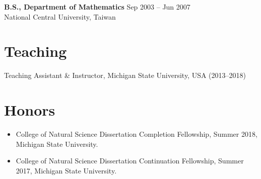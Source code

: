 \documentclass[a4paper,10pt,dvipdfmx]{article}
\begin{document}
\indent \textbf{B.S., Department of Mathematics} \hfill Sep 2003 -- Jun 2007\\
\indent National Central University, Taiwan

\section*{Teaching}
\indent Teaching Assistant \& Instructor, Michigan State University, USA (2013--2018)

\section*{Honors}
\begin{itemize}[noitemsep,nolistsep]
  \item College of Natural Science Dissertation Completion Fellowship, Summer 2018, Michigan State University.
  \item College of Natural Science Dissertation Continuation Fellowship, Summer 2017, Michigan State University.
\end{itemize}
\end{document}
